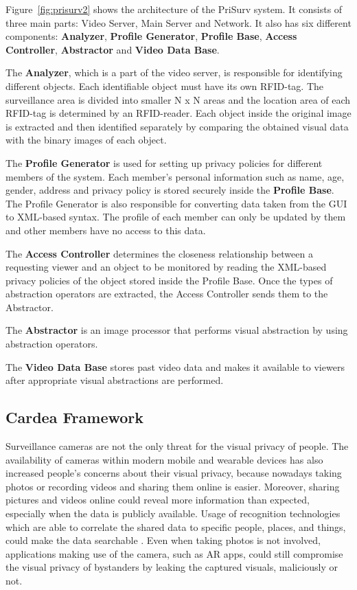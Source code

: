 \documentclass[conference]{IEEEtran}
\begin{document}
Figure~\ref{fig:prisurv2} shows the architecture of the PriSurv system. It consists of three main parts: Video Server, Main Server and Network. It also has six different components: \textbf{Analyzer}, \textbf{Profile Generator}, \textbf{Profile Base}, \textbf{Access Controller}, \textbf{Abstractor} and \textbf{Video Data Base}. 

The \textbf{Analyzer}, which is a part of the video server, is responsible for identifying different objects. Each identifiable object must have its own \ac{RFID}-tag. The surveillance area is divided into smaller N x N areas and the location area of each \ac{RFID}-tag is determined by an \ac{RFID}-reader. Each object inside the original image is extracted and then identified separately by comparing the obtained visual data with the binary images of each object. 

The \textbf{Profile Generator} is used for setting up privacy policies for different members of the system. Each member's personal information such as name, age, gender, address and privacy policy is stored securely inside the \textbf{Profile Base}. The Profile Generator is also responsible for converting data taken from the GUI to \ac{XML}-based syntax. The profile of each member can only be updated by them and other members have no access to this data. 

The \textbf{Access Controller} determines the closeness relationship between a requesting viewer and an object to be monitored by reading the \ac{XML}-based privacy policies of the object stored inside the Profile Base. Once the types of abstraction operators are extracted, the Access Controller sends them to the Abstractor. 

The \textbf{Abstractor} is an image processor that performs visual abstraction by using abstraction operators. 

The \textbf{Video Data Base} stores past video data and makes it available to viewers after appropriate visual abstractions are performed. 

\subsection{Cardea Framework}

Surveillance cameras are not the only threat for the visual privacy of people. The availability of cameras within modern mobile and wearable devices has also increased people's concerns about their visual privacy, because nowadays taking photos or recording videos and sharing them online is easier. Moreover, sharing pictures and videos online could reveal more information than expected, especially when the data is publicly available. Usage of recognition technologies which are able to correlate the shared data to specific people, places, and things, could make the data searchable \cite{gross2014, shaw2006}. Even when taking photos is not involved, applications making use of the camera, such as \ac{AR} apps, could still compromise the visual privacy of bystanders by leaking the captured visuals, maliciously or not. 
\end{document}
